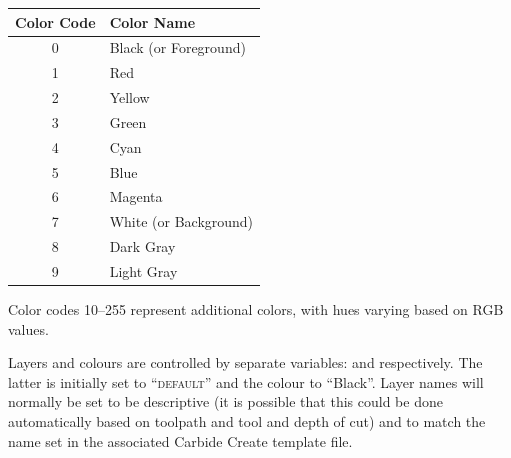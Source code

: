 \documentclass{ltxdoc}
\begin{document}
\begin{center}
\noindent\begin{tabular}{cl}
Color Code & Color Name \\
\toprule
     0 & Black (or Foreground)  \\
     1 & Red \\
     2 & Yellow \\
     3 & Green  \\
     4 & Cyan  \\
     5 & Blue \\
     6 & Magenta \\ 
     7 & White (or Background)\\
     8 & Dark Gray \\ 
     9 & Light Gray \\\bottomrule
\end{tabular}
\end{center}

Color codes 10--255 represent additional colors, with hues varying based on RGB values.

Layers and colours are controlled by separate variables:  and  respectively. The latter is initially set to ``\textsc{default}'' and the colour to ``Black''. Layer names will normally be set to be descriptive (it is possible that this could be done automatically based on toolpath and tool and depth of cut) and to match the name set in the associated Carbide Create template file.
\end{document}
